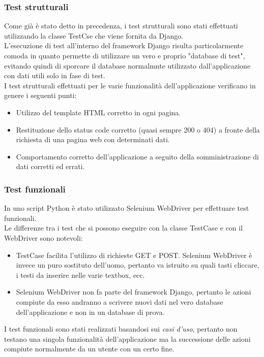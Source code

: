 \documentclass[10pt,a4paper]{report}
\begin{document}
	\subsubsection{Test strutturali}
	Come già è stato detto in precedenza, i test strutturali sono stati effettuati utilizzando la classe TestCse che viene fornita da Django. \\
	L'esecuzione di test all'interno del framework Django risulta particolarmente comoda in quanto permette di utilizzare un vero e proprio "database di test", evitando quindi di sporcare il database normalmnte utilizzato dall'applicazione con dati utili solo in fase di test. \\
	I test strutturali effettuati per le varie funzionalità dell'applicazione verificano in genere i seguenti punti:
	\begin{itemize}
		\item Utilizzo del template HTML corretto in ogni pagina.
		\item Restituzione dello status code corretto (quasi sempre 200 o 404) a fronte della richiesta di una pagina web con determinati dati.
		\item Comportamento corretto dell'applicazione a seguito della somministrazione di dati corretti ed errati.
	\end{itemize}

	\subsubsection{Test funzionali}
	In uno script Python è stato utilizzato Selenium WebDriver per effettuare test funzionali. \\
	Le differenze tra i test che si possono eseguire con la classe TestCase e con il WebDriver sono notevoli:
	\begin{itemize}
		\item TestCase facilita l'utilizzo di richieste GET e POST. Selenium WebDriver è invece un puro sostituto dell'uomo, pertanto va istruito su quali tasti cliccare, i testi da inserire nelle varie textbox, ecc.
		\item Selenium WebDriver non fa parte del framework Django, pertanto le azioni compiute da esso andranno a scrivere nuovi dati nel vero database dell'applicazione e non in un database di prova.
	\end{itemize}
	I test funzionali sono stati realizzati basandosi sui \textit{casi d'uso}, pertanto non testano una singola funzionalità dell'applicazione ma la successione delle azioni compiute normalmente da un utente con un certo fine.
	
\end{document}
